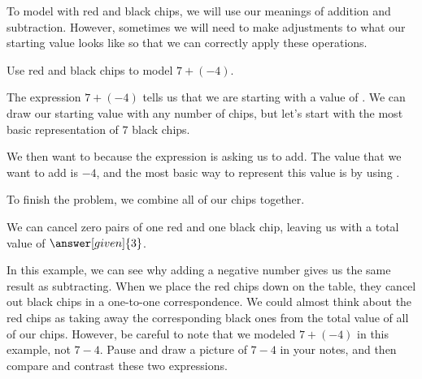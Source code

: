 \documentclass{ximera}
\begin{document}
To model with red and black chips, we will use our meanings of addition and subtraction. However, 
sometimes we will need to make adjustments to what our starting value looks like so that we can 
correctly apply these operations.

\begin{problem}
Use red and black chips to model $7 + (-4)$.

\begin{explanation}
The expression $7 + (-4)$ tells us that we are starting with a value of . We can draw our starting value with any number of chips, but let's start with the most basic representation of $7$ black chips.

\begin{image}
\end{image}


We then want to  because the expression is asking us to add. The value that we want to add is $-4$, and the most basic way to represent this value is by using . 

To finish the problem, we combine all of our chips together.
\begin{image}
\end{image}

We can cancel zero pairs of one red and one black chip, leaving us with a total value of $\answer[given]{3}$.

\end{explanation}
\end{problem}
In this example, we can see why adding a negative number gives us the same result as subtracting. When we place the red chips down on the table, they cancel out black chips in a one-to-one correspondence. We could almost think about the red chips as taking away the corresponding black ones from the total value of all of our chips. However, be careful to note that we modeled $7 + (-4)$ in this example, not $7 - 4$. Pause and draw a picture of $7-4$ in your notes, and then compare and contrast these two expressions.
\end{document}
